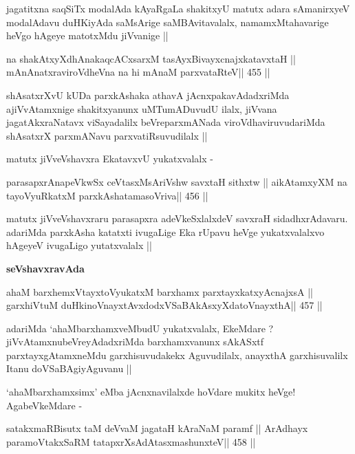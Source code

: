 \begin{artha}
jagatitxna saqSiTx modalAda kAyaRgaLa  shakitxyU matutx adara
sAmanirxyeV modalAdavu duHKiyAda saMsArige saMBAvitavalalx,
namamxMtahavarige heVgo hAgeye matotxMdu jiVvanige ||
\end{artha}

\begin{shl}
na shakAtxyXdhAnakaqcACxsarxM tasAyxBivayxcnajxkatavxtaH ||
mAnAnatxraviroVdheVna na hi mAnaM parxvataRteV\hfill || 455 ||
\end{shl}

\begin{artha}
shAsatxrXvU kUDa parxkAshaka athavA jAcnxpakavAdadxriMda
ajiVvAtamxnige shakitxyanunx uMTumADuvudU ilalx, jiVvana
jagatAkxraNatavx viSayadalilx beVreparxmANada viroVdhaviruvudariMda
shAsatxrX parxmANavu parxvatiRsuvudilalx ||

matutx jiVveVshavxra EkatavxvU yukatxvalalx -
\end{artha}

\begin{shl}
parasapxrAnapeVkwSx ceVtasxMsAriVshw savxtaH sithxtw ||
aikAtamxyXM na tayoVyuRkatxM parxkAshatamasoVriva\hfill || 456 ||
\end{shl}

\begin{artha}
matutx jiVveVshavxraru parasapxra adeVkeSxlalxdeV savxraH
sidadhxrAdavaru. adariMda parxkAsha katatxti ivugaLige Eka rUpavu
heVge yukatxvalalxvo hAgeyeV ivugaLigo yutatxvalalx ||
\end{artha}

\medskip
\centerline{\textbf{seVshavxravAda}}

\begin{shl}
ahaM barxhemxVtayxtoV\s yukatxM barxhamx parxtayxkatxyA\s cnajxsA ||
garxhiVtuM duHkinoV\s nayxtAvxdodxVSaBAkAsxyXdatoV\s nayxthA\hfill || 457 ||
\end{shl}

\begin{artha}
adariMda `ahaMbarxhamxveMbudU yukatxvalalx, EkeMdare ?
jiVvAtamxnubeVreyAdadxriMda barxhamxvanunx sAkASxtf
parxtayxgAtamxneMdu garxhisuvudakekx Aguvudilalx, anayxthA
garxhisuvalilx Itanu doVSaBAgiyAguvanu ||
\end{artha}

\begin{artha}
`ahaMbarxhamxsimx' eMba jAcnxnavilalxde hoVdare mukitx heVge!
  AgabeVkeMdare -
\end{artha}

\begin{shl}
satakxmaRBisutx taM deVvaM jagataH kAraNaM paramf ||
ArAdhayx paramoVtakxSaRM tatapxrXsAdAtasxmashunxteV\hfill || 458 ||
\end{shl}

